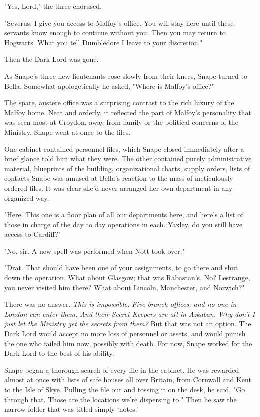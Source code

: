 "Yes, Lord," the three chorused.

"Severus, I give you access to Malfoy's office. You will stay here until these servants know enough to continue without you. Then you may return to Hogwarts. What you tell Dumbledore I leave to your discretion."

Then the Dark Lord was gone.

As Snape's three new lieutenants rose slowly from their knees, Snape turned to Bella. Somewhat apologetically he asked, "Where is Malfoy's office?"

The spare, austere office was a surprising contrast to the rich luxury of the Malfoy home. Neat and orderly, it reflected the part of Malfoy's personality that was seen most at Croydon, away from family or the political concerns of the Ministry. Snape went at once to the files.

One cabinet contained personnel files, which Snape closed immediately after a brief glance told him what they were. The other contained purely administrative material, blueprints of the building, organizational charts, supply orders, lists of contacts{\el} Snape was amused at Bella's reaction to the mass of meticulously ordered files. It was clear she'd never arranged her own department in any organized way.

"Here. This one is a floor plan of all our departments here, and here's a list of those in charge of the day to day operations in each. Yaxley, do you still have access to Cardiff?"

"No, sir. A new spell was performed when Nott took over."

"Drat. That should have been one of your assignments, to go there and shut down the operation. What about Glasgow; that was Rabastan's. No? Lestrange, you never visited him there? What about Lincoln, Manchester, and Norwich?"

There was no answer. \emph{This is impossible. Five branch offices, and no one in London can enter them. And their Secret-Keepers are all in Azkaban. Why don't I just let the Ministry get the secrets from them?} But that was not an option. The Dark Lord would accept no more loss of personnel or assets, and would punish the one who failed him now, possibly with death. For now, Snape worked for the Dark Lord to the best of his ability.

Snape began a thorough search of every file in the cabinet. He was rewarded almost at once with lists of safe houses all over Britain, from Cornwall and Kent to the Isle of Skye. Pulling the file out and tossing it on the desk, he said, "Go through that. Those are the locations we're dispersing to." Then he saw the narrow folder that was titled simply `notes.'

